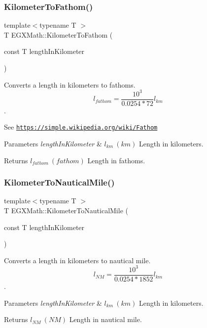 \subsubsection{\texorpdfstring{Kilometer\+To\+Fathom()}{KilometerToFathom()}}
{\footnotesize\ttfamily template$<$typename T $>$ \\
T E\+G\+X\+Math\+::\+Kilometer\+To\+Fathom (\begin{DoxyParamCaption}\item[{const T}]{length\+In\+Kilometer }\end{DoxyParamCaption})}



Converts a length in kilometers to fathoms. \[ l_{fathom}= \frac{10^{3}}{0.0254 * 72} l_{km} \]. 

See \href{https://simple.wikipedia.org/wiki/Fathom}{\tt https\+://simple.\+wikipedia.\+org/wiki/\+Fathom} 
\begin{DoxyParams}{Parameters}
{\em length\+In\+Kilometer} & $ l_{km}\ (km)$ Length in kilometers. \\
\hline
\end{DoxyParams}
\begin{DoxyReturn}{Returns}
$ l_{fathom}\ (fathom)$ Length in fathoms. 
\end{DoxyReturn}
\mbox{\label{group___e_g_x_math-_conversions-_length_conversions-_s_i-_kilometer-_nautical_ga4571f464f551ae965f88192b53dd24ff}} 
\subsubsection{\texorpdfstring{Kilometer\+To\+Nautical\+Mile()}{KilometerToNauticalMile()}}
{\footnotesize\ttfamily template$<$typename T $>$ \\
T E\+G\+X\+Math\+::\+Kilometer\+To\+Nautical\+Mile (\begin{DoxyParamCaption}\item[{const T}]{length\+In\+Kilometer }\end{DoxyParamCaption})}



Converts a length in kilometers to nautical mile. \[ l_{NM}= \frac{10^{3}}{0.0254 * 1852} l_{km} \]. 


\begin{DoxyParams}{Parameters}
{\em length\+In\+Kilometer} & $ l_{km}\ (km)$ Length in kilometers. \\
\hline
\end{DoxyParams}
\begin{DoxyReturn}{Returns}
$ l_{NM}\ (NM)$ Length in nautical mile. 
\end{DoxyReturn}
